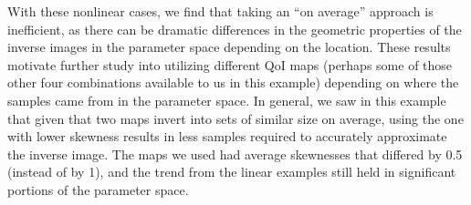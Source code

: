 With these nonlinear cases, we find that taking an ``on average'' approach is inefficient, as there can be dramatic differences in the geometric properties of the inverse images in the parameter space depending on the location.
These results motivate further study into utilizing different QoI maps (perhaps some of those other four combinations available to us in this example) depending on where the samples came from in the parameter space. 
In general, we saw in this example that given that two maps invert into sets of similar size on average, using the one with lower skewness results in less samples required to accurately approximate the inverse image. 
The maps we used had average skewnesses that differed by 0.5 (instead of by 1), and the trend from the linear examples still held in significant portions of the parameter space. 



